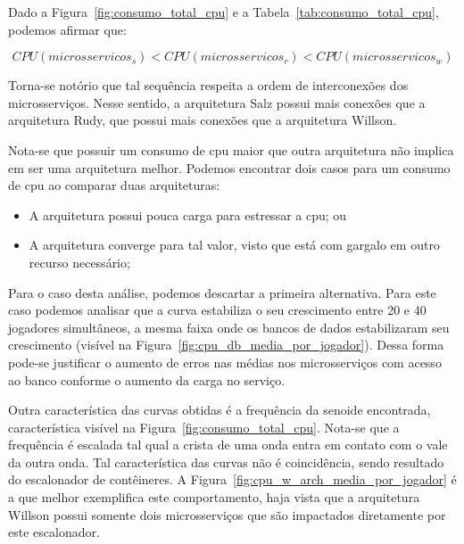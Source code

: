 Dado a Figura~\ref{fig:consumo_total_cpu} e a Tabela~\ref{tab:consumo_total_cpu}, podemos afirmar que:

$$
    CPU(microsservicos_{s}) < CPU(microsservicos_{r}) < CPU(microsservicos_{w})
$$

Torna-se notório que tal sequência respeita a ordem de interconexões dos microsserviços.
%
Nesse sentido, a arquitetura Salz possui mais conexões que a arquitetura Rudy, que possui mais conexões que a arquitetura Willson.

Nota-se que possuir um consumo de \ac{cpu} maior que outra arquitetura não implica em ser uma arquitetura melhor.
%
Podemos encontrar dois casos para um consumo de \ac{cpu} ao comparar duas arquiteturas:

\begin{itemize}
 \item A arquitetura possui pouca carga para estressar a \ac{cpu}; ou
 \item A arquitetura converge para tal valor, visto que está com gargalo em outro recurso necessário;
\end{itemize}

Para o caso desta análise, podemos descartar a primeira alternativa.
%
Para este caso podemos analisar que a curva estabiliza o seu crescimento entre 20 e 40 jogadores simultâneos, a mesma faixa onde os bancos de dados estabilizaram seu crescimento (visível na Figura~\ref{fig:cpu_db_media_por_jogador}).
%
Dessa forma pode-se justificar o aumento de erros nas médias nos microsserviços com acesso ao banco conforme o aumento da carga no serviço.

Outra característica das curvas obtidas é a frequência da senoide encontrada, característica visível na Figura~\ref{fig:consumo_total_cpu}.
%
Nota-se que a frequência é escalada tal qual a crista de uma onda entra em contato com o vale da outra onda.
%
Tal característica das curvas não é coincidência, sendo resultado do escalonador de contêineres.
%
A Figura~\ref{fig:cpu_w_arch_media_por_jogador} é a que melhor exemplifica este comportamento, haja vista que a arquitetura Willson possui somente dois microsserviços que são impactados diretamente por este escalonador.
